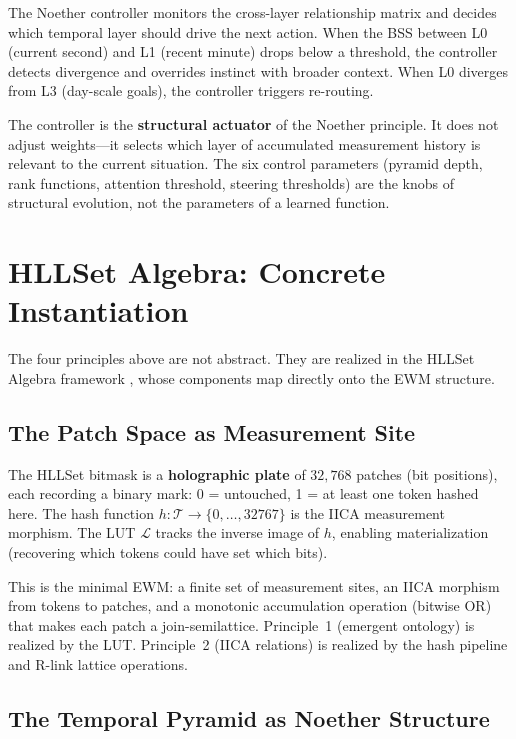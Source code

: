 \documentclass[11pt,a4paper]{article}
\theoremstyle{remark}
\begin{document}
The Noether controller monitors the cross-layer relationship matrix and decides which
temporal layer should drive the next action. When the BSS between L0 (current second)
and L1 (recent minute) drops below a threshold, the controller detects divergence and
overrides instinct with broader context. When L0 diverges from L3 (day-scale goals),
the controller triggers re-routing.

The controller is the \textbf{structural actuator} of the Noether principle. It does not
adjust weights---it selects which layer of accumulated measurement history is relevant
to the current situation. The six control parameters (pyramid depth, rank functions,
attention threshold, steering thresholds) are the knobs of structural evolution, not the
parameters of a learned function.

\section{HLLSet Algebra: Concrete Instantiation}
\label{sec:hllset}

The four principles above are not abstract. They are realized in the HLLSet Algebra
framework \cite{astesj2026}, whose components map directly onto the EWM structure.

\subsection{The Patch Space as Measurement Site}

The HLLSet bitmask is a \textbf{holographic plate} of $32{,}768$ patches (bit
positions), each recording a binary mark: 0 = untouched, 1 = at least one token hashed
here. The hash function $h: \mathcal{T} \to \{0,\ldots,32767\}$ is the IICA measurement
morphism. The LUT $\mathcal{L}$ tracks the inverse image of $h$, enabling materialization
(recovering which tokens could have set which bits).

This is the minimal EWM: a finite set of measurement sites, an IICA morphism from tokens
to patches, and a monotonic accumulation operation (bitwise OR) that makes each patch a
join-semilattice. Principle~1 (emergent ontology) is realized by the LUT. Principle~2
(IICA relations) is realized by the hash pipeline and R-link lattice operations.

\subsection{The Temporal Pyramid as Noether Structure}
\end{document}
